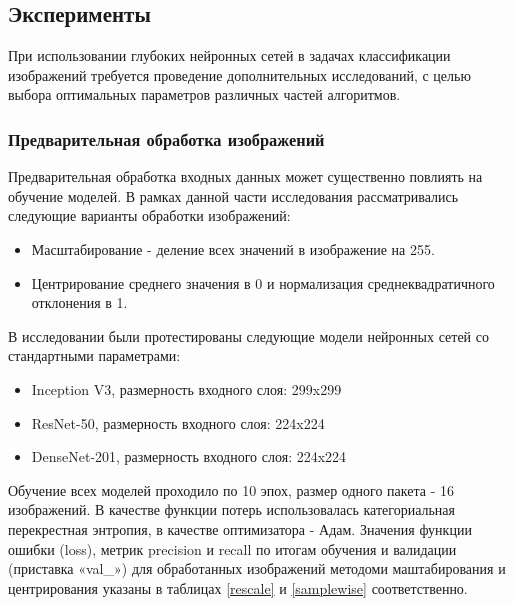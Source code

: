 
% 



\subsection{Эксперименты}
При использовании глубоких нейронных сетей в задачах классификации изображений требуется проведение дополнительных исследований, с целью выбора оптимальных параметров различных частей алгоритмов. 

\subsubsection{Предварительная обработка изображений}
Предварительная обработка входных данных может существенно повлиять на обучение моделей. В рамках данной части исследования рассматривались следующие варианты обработки изображений:
\begin{itemize}    
    \item Масштабирование - деление всех значений в изображение на 255.
    \item Центрирование среднего значения в 0 и нормализация среднеквадратичного отклонения в 1.
\end{itemize}
В исследовании были протестированы следующие модели нейронных сетей со стандартными параметрами:
\begin{itemize}
    \item Inception V3, размерность входного слоя: 299x299
    \item ResNet-50, размерность входного слоя: 224x224
    \item DenseNet-201, размерность входного слоя:  224x224
\end{itemize} 
Обучение всех моделей проходило по 10 эпох, размер одного пакета - 16 изображений. В качестве функции потерь использовалась категориальная перекрестная энтропия, в качестве оптимизатора - Адам. 
Значения функции ошибки (loss), метрик precision и recall  по итогам обучения и валидации (приставка «val\_») для обработанных изображений методоми маштабирования и центрирования указаны в таблицах \ref{rescale} и \ref{samplewise} соответственно. 

